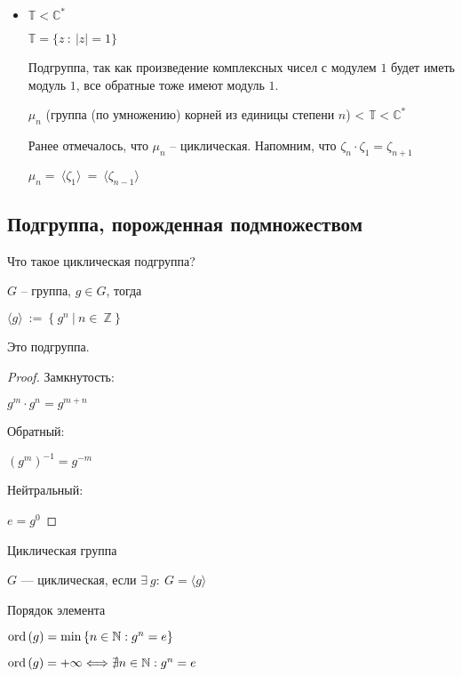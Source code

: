 \begin{itemize}
\item $\mathbb{T} < \mathbb{C}^*$

$\mathbb{T} = \{ z\ :\ |z| = 1 \}$

Подгруппа, так как произведение комплексных чисел с модулем $1$ будет иметь модуль $1$, все обратные тоже имеют модуль $1$.

$\mu_n$ (группа (по умножению) корней из единицы степени $n$) < $\mathbb{T} < \mathbb{C}^*$ 

Ранее отмечалось, что $\mu_n$ -- циклическая. Напомним, что $\zeta_n \cdot \zeta_1 = \zeta_{n+1}$

$\mu_n =\ \langle \zeta_1 \rangle\ =\ \langle\zeta_{n-1}\rangle$
\end{itemize} 

\subsection{Подгруппа, порожденная подмножеством}
Что такое циклическая подгруппа?

$G$ -- группа, $g\in G$, тогда

$\langle g \rangle\ :=\ \{\ g^n\ |\ n\in\ \mathbb{Z}\ \}$

\begin{theorem}
Это подгруппа.

\begin{proof}
Замкнутость: 

$g^m\cdot g^n = g^{m+n}$

Обратный: 

$(g^m)^{-1} = g^{-m}$

Нейтральный: 

$e = g^0$

\end{proof}
\end{theorem}

\begin{conj} Циклическая группа

$G$ --- циклическая, если $\exists\ g:\ G = \langle g \rangle$
\end{conj}

\begin{conj} Порядок элемента

  $\operatorname{ord}\left( g \right) = \min{ \{ n\in \mathbb{N} : g^n = e \} }$

  $\operatorname{ord}\left( g \right) = +\infty \Longleftrightarrow \nexists n\in \mathbb{N} : g^n = e$
\end{conj}

